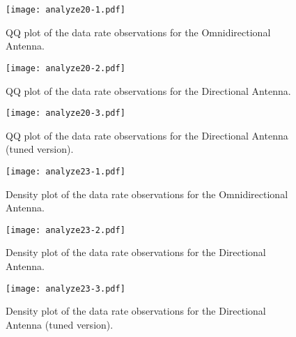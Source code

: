

% 
% 


\begin{figure}[!htbp]
 \begin{center}
  \texttt{[image: analyze20-1.pdf]}
 \end{center}
 \caption{QQ plot of the data rate observations for the Omnidirectional Antenna.}
  \label{fig:cf201}
\end{figure}

\begin{figure}[!htbp]
 \begin{center}
  \texttt{[image: analyze20-2.pdf]}
 \end{center}
 \caption{QQ plot of the data rate observations for the Directional Antenna.}
  \label{fig:cf202}
\end{figure}

\begin{figure}[!htbp]
 \begin{center}
  \texttt{[image: analyze20-3.pdf]}
 \end{center}
 \caption{QQ plot of the data rate observations for the Directional Antenna (tuned version).}
  \label{fig:cf203}
\end{figure}

\newpage

% 
% 


\begin{figure}[!htbp]
 \begin{center}
  \texttt{[image: analyze23-1.pdf]}
 \end{center}
 \caption{Density plot of the data rate observations for the Omnidirectional Antenna.}
  \label{fig:cf231}
\end{figure}

\begin{figure}[!htbp]
 \begin{center}
  \texttt{[image: analyze23-2.pdf]}
 \end{center}
\caption{Density plot of the data rate observations for the Directional Antenna.}
  \label{fig:cf232}
\end{figure}

\begin{figure}[!htbp]
 \begin{center}
  \texttt{[image: analyze23-3.pdf]}
 \end{center}
 \caption{Density plot of the data rate observations for the Directional Antenna (tuned version).}
  \label{fig:cf233}
\end{figure}


